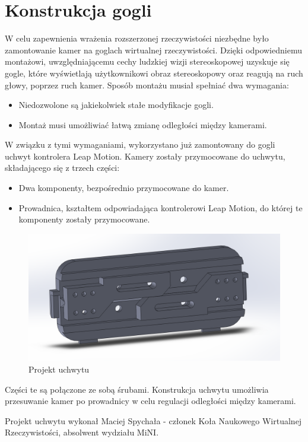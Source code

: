 \documentclass[a4paper,11pt,twoside]{report}
\theoremstyle{definition}
\begin{document}
\section{Konstrukcja gogli}
W celu zapewnienia wrażenia rozszerzonej rzeczywistości niezbędne było zamontowanie kamer na goglach wirtualnej rzeczywistości. Dzięki odpowiedniemu montażowi, uwzględniającemu cechy ludzkiej wizji stereoskopowej uzyskuje się gogle, które wyświetlają użytkownikowi obraz stereoskopowy oraz reagują na ruch głowy, poprzez ruch kamer.
Sposób montażu musiał spełniać dwa wymagania:
\begin{itemize}
\item Niedozwolone są jakiekolwiek stałe modyfikacje gogli.
\item Montaż musi umożliwiać łatwą zmianę odległości między kamerami.
\end{itemize}
W związku z tymi wymaganiami, wykorzystano już zamontowany do gogli uchwyt kontrolera Leap Motion. Kamery zostały przymocowane do uchwytu, składającego się z trzech części:
\begin{itemize}
\item Dwa komponenty, bezpośrednio przymocowane do kamer.
\item Prowadnica, kształtem odpowiadająca kontrolerowi Leap Motion, do której te komponenty zostały przymocowane.
\end{itemize}

\begin{figure}[H]
\centering
\includegraphics[scale=0.3]{images/cameraHolder}
\caption[Projekt uchwytu]{Projekt uchwytu}
\end{figure}

Części te są połączone ze sobą śrubami. Konstrukcja uchwytu umożliwia przesuwanie kamer po prowadnicy w celu regulacji odległości między kamerami.

Projekt uchwytu wykonał Maciej Spychała - członek Koła Naukowego Wirtualnej Rzeczywistości, absolwent wydziału MiNI.
\end{document}

